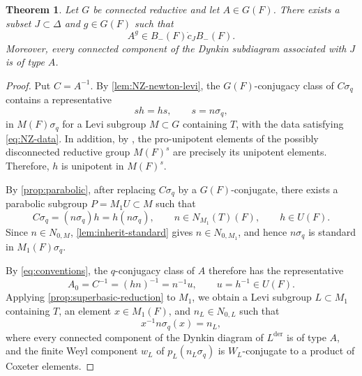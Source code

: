 \documentclass[11pt]{amsart}
\numberwithin{equation}{section}
\newtheorem{theorem}{Theorem}[section]
\theoremstyle{definition}
\theoremstyle{remark}
\begin{document}
\begin{theorem}\label{thm:partial-cell}
Let $G$ be connected reductive and let $A\in G(F)$. There exists a
subset $J\subset\Delta$ and $g\in G(F)$ such that
\[
  A^g\in B_-(F)\dot c_JB_-(F).
\]
Moreover, every connected component of the Dynkin subdiagram associated with $J$ is of type $A$.
\end{theorem}
\begin{proof}
Put $C=A^{-1}$. By \cref{lem:NZ-newton-levi}, the
$G(F)$-conjugacy class of $C\sigma_q$ contains a representative
\[
  sh=hs,
  \qquad
  s=n\sigma_q,
\]
in $M(F)\sigma_q$ for a Levi subgroup $M\subset G$ containing $T$, with the data satisfying \eqref{eq:NZ-data}. In addition, by \cite[Section~4]{NZ}, the pro-unipotent elements of the possibly disconnected reductive group $M(F)^s$ are precisely its unipotent elements.
Therefore, $h$ is unipotent in $M(F)^s$. 

By \cref{prop:parabolic}, after replacing
$C\sigma_q$ by a $G(F)$-conjugate, there exists a parabolic subgroup $  P=M_1U\subset M$ such that
\[
  C\sigma_q=(n\sigma_q)h=h(n\sigma_q),
  \qquad
  n\in N_{M_1}(T)(F),
  \qquad
  h\in U(F).
\]
Since $n\in N_{0,M}$, \cref{lem:inherit-standard} gives
$n\in N_{0,M_1}$, and hence $n\sigma_q$ is standard in
$M_1(F)\sigma_q$.

By
\eqref{eq:conventions}, the $q$-conjugacy class of $A$ therefore has the
representative
\begin{equation}\label{eq:separated-A}
  A_0=C^{-1}=(hn)^{-1}=n^{-1}u,
  \qquad
  u=h^{-1}\in U(F).
\end{equation}
Applying \cref{prop:superbasic-reduction} to $M_1$, we obtain a Levi
subgroup $L\subset M_1$ containing $T$, an element
$x\in M_1(F)$, and $n_L\in N_{0,L}$ such that
\begin{equation}\label{eq:nL-conjugation}
  x^{-1}n\sigma_q(x)=n_L,
\end{equation}
where every connected component of the Dynkin diagram of
$L^{\mathrm{der}}$ is of type $A$, and the finite Weyl component
$w_L$ of $p_L(n_L\sigma_q)$ is $W_L$-conjugate to a product of
Coxeter elements.


\end{proof}
\end{document}
